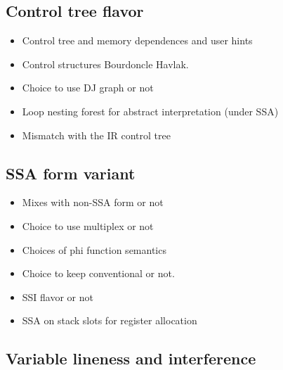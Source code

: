 \subsection{Control tree flavor}



\begin{itemize}

\item Control tree and memory dependences and user hints

\item Control structures Bourdoncle Havlak.

\item Choice to use DJ graph or not

\item Loop nesting forest for abstract interpretation (under SSA)

\item Mismatch with the IR control tree

\end{itemize}

\subsection{SSA form variant}

\begin{itemize}

\item Mixes with non-SSA form or not

\item Choice to use multiplex or not

\item Choices of phi function semantics

\item Choice to keep conventional or not.

\item SSI flavor or not

\item SSA on stack slots for register allocation

\end{itemize}

\subsection{Variable lineness and interference}


